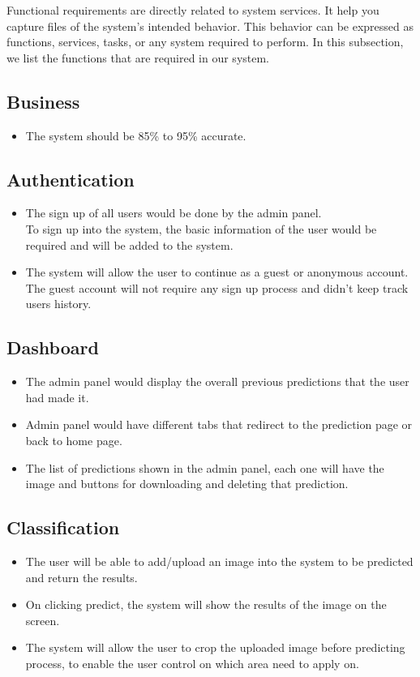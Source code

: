 Functional requirements are directly related to system services. It help you capture files of the system’s intended behavior. This behavior can be expressed as functions, services, tasks, or any system required to perform. In this subsection, we list the functions that are required in our system.

\subsection{Business}
\begin{itemize}
  \item The system should be 85\% to 95\% accurate.
\end{itemize}

\subsection{Authentication}
\begin{itemize}
  \item The sign up of all users would be done by the admin panel. \\
        To sign up into the system, the basic information of the user would be required and will be added to the system.
  \item The system will allow the user to continue as a guest or anonymous account. \\
  The guest account will not require any sign up process and didn't keep track users history.
\end{itemize}

\subsection{Dashboard}
\begin{itemize}
 \item The admin panel would display the overall previous predictions that the user had made it.
 \item Admin panel would have different tabs that redirect to the prediction page or back to home page.
 \item The list of predictions shown in the admin panel, each one will have the image and buttons for downloading and deleting that prediction.
\end{itemize}

\subsection{Classification}
\begin{itemize}
 \item The user will be able to add/upload an image into the system to be predicted and return the results.
 \item On clicking predict, the system will show the results of the image on the screen.
 \item The system will allow the user to crop the uploaded image before predicting process, to enable the user control on which area need to apply on.
\end{itemize}

